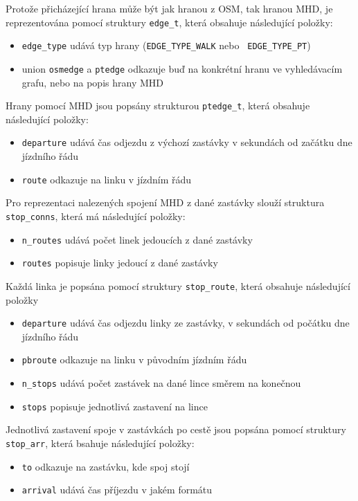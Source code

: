 Protože přicházející hrana může být jak hranou z OSM, tak hranou MHD, je
reprezentována pomocí struktury {\tt edge\_t}, která obsahuje následující
položky:
\begin{itemize}
	\item {\tt edge\_type} udává typ hrany ({\tt EDGE\_TYPE\_WALK} nebo {\tt
	EDGE\_TYPE\_PT})
	\item union {\tt osmedge} a {\tt ptedge} odkazuje buď na konkrétní hranu
	ve vyhledávacím grafu, nebo na popis hrany MHD 
\end{itemize}
Hrany pomocí MHD jsou popsány strukturou {\tt ptedge\_t}, která obsahuje
následující položky: 
\begin{itemize}
	\item {\tt departure} udává čas odjezdu z výchozí zastávky v sekundách
	od začátku dne jízdního řádu
	\item {\tt route} odkazuje na linku v jízdním řádu
\end{itemize}

Pro reprezentaci nalezených spojení MHD z dané zastávky slouží struktura {\tt
stop\_conns}, která má následující položky:
\begin{itemize}
	\item {\tt n\_routes} udává počet linek jedoucích z dané zastávky
	\item {\tt routes} popisuje linky jedoucí z dané zastávky
\end{itemize}
Každá linka je popsána pomocí struktury {\tt stop\_route}, která obsahuje
následující položky 
\begin{itemize}
	\item {\tt departure} udává čas odjezdu linky ze zastávky, v sekundách
	od počátku dne jízdního řádu 
	\item {\tt pbroute} odkazuje na linku v původním jízdním řádu
	\item {\tt n\_stops} udává počet zastávek na dané lince směrem na
	konečnou
	\item {\tt stops} popisuje jednotlivá zastavení na lince
\end{itemize}
Jednotlivá zastavení spoje v zastávkách po cestě jsou popsána pomocí struktury
{\tt stop\_arr}, která bsahuje následující položky:
\begin{itemize}
	\item {\tt to} odkazuje na zastávku, kde spoj stojí
	\item {\tt arrival} udává čas příjezdu \TODO v jakém formátu
\end{itemize}
 
